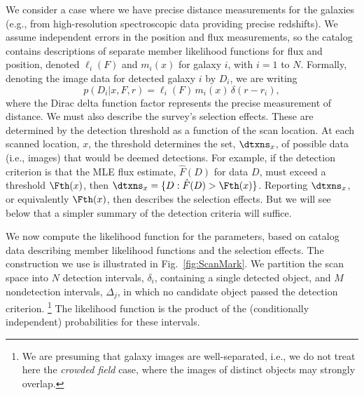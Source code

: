 We consider a case where we have precise distance measurements for the galaxies (e.g., from high-resolution spectroscopic data providing precise redshifts).
We assume independent errors in the position and flux measurements, so the catalog contains descriptions of separate member likelihood functions for flux and position, denoted $\ell_i(F)$ and $m_i(x)$ for galaxy $i$, with $i=1$ to $N$.
Formally, denoting the image data for detected galaxy $i$ by $D_i$, we are writing
\begin{equation}\label{eq:xFr-like}
p(D_i|x,F,r) = \ell_i(F)\, m_i(x)\, \delta(r - r_i),
\end{equation}
where the Dirac delta function factor represents the precise measurement of distance.
We must also describe the survey's selection effects.
These are determined by the detection threshold as a function of the scan location.
At each scanned location, $x$, the threshold determines the set, $\dtxns_x$, of possible data (i.e., images) that would be deemed detections.
For example, if the detection criterion is that the MLE flux estimate, $\hat F(D)$ for data $D$, must exceed a threshold $\Fth(x)$, then $\dtxns_x = \{D : \hat{F}(D) > \Fth(x)\}$.
Reporting $\dtxns_x$, or equivalently $\Fth(x)$, then describes the selection effects.
But we will see below that a simpler summary of the detection criteria will suffice.


We now compute the likelihood function for the parameters, based on catalog data describing member likelihood functions and the selection effects.
The construction we use is illustrated in Fig.~\ref{fig:ScanMark}.
We partition the scan space into $N$ detection intervals, $\delta_i$, containing a single detected object, and $M$ nondetection intervals, $\Delta_j$, in which no candidate object passed the detection criterion.%
\footnote{We are presuming that galaxy images are well-separated, i.e., we do not treat here the \emph{crowded field} case, where the images of distinct objects may strongly overlap.}
The likelihood function is the product of the (conditionally independent) probabilities for these intervals.

